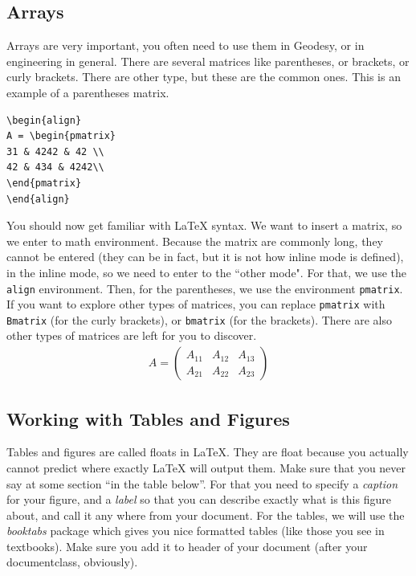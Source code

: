 \documentclass[paper=a4, fontsize=11pt]{scrartcl} %
\numberwithin{equation}{section} %
\numberwithin{figure}{section} %
\numberwithin{table}{section} %
\begin{document}
\subsection{Arrays}
Arrays are very important, you often need to use them in Geodesy, or in engineering in general. There are several matrices like parentheses, or brackets, or curly brackets. There are other type, but these are the common ones.
This is an example of a parentheses matrix. 
\begin{verbatim}
\begin{align}
A = \begin{pmatrix}
31 & 4242 & 42 \\
42 & 434 & 4242\\
\end{pmatrix}
\end{align}
\end{verbatim}
You should now get familiar with LaTeX syntax. We want to insert a matrix, so we enter to math environment. Because the matrix are commonly long, they cannot be entered (they can be in fact, but it is not how inline mode is defined), in the inline mode, so we need to enter to the ``other mode". For that, we use the \verb|align| environment. Then, for the parentheses, we use the environment \verb|pmatrix|. If you want to explore other types of matrices, you can replace \verb|pmatrix| with \verb|Bmatrix| (for the curly brackets), or \verb|bmatrix| (for the brackets). There are also other types of matrices are left for you to discover.
\begin{align}
A = \begin{pmatrix}
A_{11} & A_{12} & A_{13}\\
A_{21} & A_{22} & A_{23}
\end{pmatrix}
\end{align}

\subsection{Working with Tables and Figures}
Tables and figures are called floats in LaTeX. They are float because you actually cannot predict where exactly LaTeX will output them. Make sure that you never say at some section ``in the table below''. For that you need to specify a \textit{caption} for your figure, and a \textit{label} so that you can describe exactly what is this figure about, and call it any where from your document. For the tables, we will use the \textit{booktabs} package which gives you nice formatted tables (like those you see in textbooks). Make sure you add it to header of your document (after your documentclass, obviously).
\end{document}
